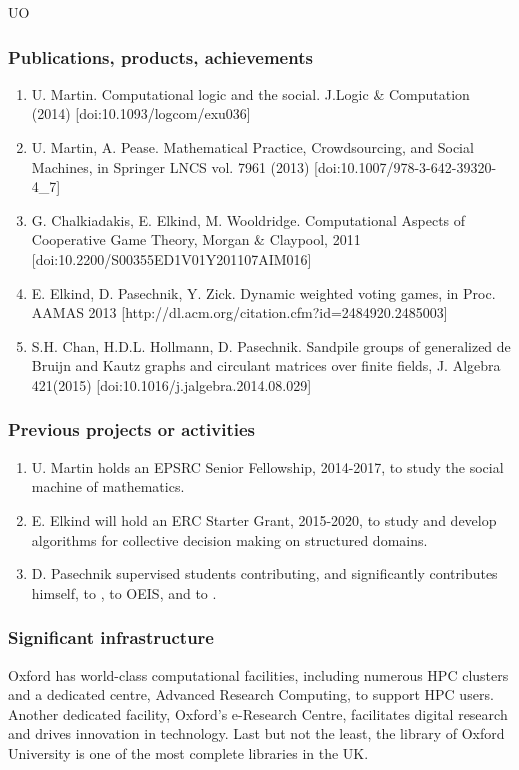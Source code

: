 \begin{sitedescription}{UO}
\subsubsection*{Publications, products, achievements}
\begin{enumerate}
\item U. Martin. Computational logic and the social. J.Logic \& Computation (2014) [doi:10.1093/logcom/exu036]
\item U. Martin, A. Pease. Mathematical Practice, Crowdsourcing, and Social Machines, in Springer LNCS vol. 7961 (2013) [doi:10.1007/978-3-642-39320-4\_7]
\item G. Chalkiadakis, E. Elkind, M. Wooldridge. Computational Aspects of Cooperative Game Theory, Morgan \& Claypool, 2011 [doi:10.2200/S00355ED1V01Y201107AIM016]
\item E. Elkind, D. Pasechnik, Y. Zick. Dynamic weighted voting games, in Proc. AAMAS 2013 [http://dl.acm.org/citation.cfm?id=2484920.2485003]
\item S.H. Chan, H.D.L. Hollmann, D. Pasechnik. Sandpile groups of generalized de Bruijn and Kautz graphs and circulant matrices over finite fields,
J. Algebra 421(2015) [doi:10.1016/j.jalgebra.2014.08.029]
\end{enumerate}

\subsubsection*{Previous projects or activities}

\begin{enumerate}
\item %
U. Martin holds an EPSRC Senior Fellowship, 2014-2017, to study the social machine of mathematics.
\item E. Elkind will hold an ERC Starter Grant, 2015-2020, to study and develop algorithms for collective decision
making on structured domains.
\item D. Pasechnik supervised  students contributing,  and significantly contributes himself, to \Sage, to OEIS, and to \GAP.
\end{enumerate}

\subsubsection*{Significant infrastructure}
Oxford has world-class computational facilities, including numerous HPC clusters and a dedicated
centre, Advanced Research Computing, to support HPC users.
Another dedicated facility, Oxford's e-Research Centre, facilitates 
digital research and drives innovation in technology. Last but not the least,
the library of Oxford University is one of the most complete libraries in the UK.
\end{sitedescription}







